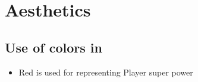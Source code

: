 %
%
%

\section{\projectname Aesthetics}

\subsection{Use of colors in \projectname}
\begin{itemize}
\item Red is used for representing Player super power
\end{itemize}


